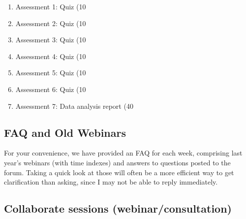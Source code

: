 \documentclass[11pt]{article}
\begin{document}
\begin{enumerate}
  \item Assessment 1: Quiz (10%
  \item Assessment 2: Quiz (10%
  \item Assessment 3: Quiz (10%
  \item Assessment 4: Quiz (10%
  \item Assessment 5: Quiz (10%
  \item Assessment 6: Quiz (10%
  \item Assessment 7: Data analysis report (40%
\end{enumerate}

\subsection{FAQ and Old Webinars}\label{subsec:faq-and-old-webinars}
For your convenience, we have provided an FAQ for each week, comprising last year's webinars (with time indexes) and answers to questions posted to the forum.
Taking a quick look at those will often be a more efficient way to get clarification than asking, since I may not be able to reply immediately.

\subsection{Collaborate sessions (webinar/consultation)}\label{subsec:collaborate-sessions-(webinar/consultation)}
\end{document}
